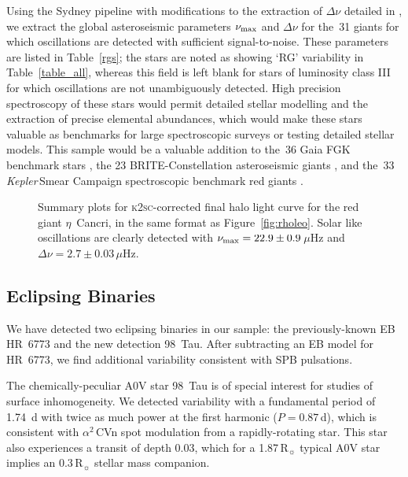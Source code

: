 \documentclass[modern]{aastex62}
\newcommand{\numax}{\mbox{$\nu_{\rm max}$}\xspace}
\newcommand{\Dnu}{\mbox{$\Delta \nu$}\xspace}
\newcommand{\muHz}{\mbox{$\mu$Hz}\xspace}
\newcommand{\rsun}{\mbox{$\mathrm{R}_{\sun}$}\xspace}
\newcommand\kepler{\emph{Kepler}\,}
\begin{document}
Using the Sydney pipeline \citep{Huber2009} with modifications to the extraction of \Dnu detailed in \citep{Yu2018}, we extract the global asteroseismic parameters \numax and \Dnu for the~31 giants for which oscillations are detected with sufficient signal-to-noise. These parameters are listed in Table~\ref{rgs}; the stars are noted as showing `RG' variability in Table~\ref{table_all}, whereas this field is left blank for stars of luminosity class III for which oscillations are not unambiguously detected. High precision spectroscopy of these stars would permit detailed stellar modelling and the extraction of precise elemental abundances, which would make these stars valuable as benchmarks for large spectroscopic surveys or testing detailed stellar models. This sample would be a valuable addition to the~36 Gaia FGK benchmark stars \citep{gaiabenchmark1,gaiabenchmark3,2018RNAAS...2c.152J}, the 23 BRITE-Constellation asteroseismic giants \citep{Kallinger2019}, and the~33 \kepler Smear Campaign spectroscopic benchmark red giants \citep{smearcampaign}. 

\begin{figure*}
\caption{Summary plots for \textsc{k2sc}-corrected final halo light curve for the red giant $\eta$~Cancri, in the same format as Figure~\ref{fig:rholeo}. Solar like oscillations are clearly detected with $\numax = 22.9 \pm 0.9$\,\muHz and $\Dnu = 2.7 \pm 0.03$\,\muHz.}
\label{fig:etacnc}
\end{figure*}


\subsection{Eclipsing Binaries}
\label{sec:ebs}

We have detected two eclipsing binaries in our sample: the previously-known EB HR~6773 and the new detection 98~Tau. After subtracting an EB model for HR~6773, we find additional variability consistent with SPB pulsations. 


The chemically-peculiar A0V star 98~Tau is of special interest for studies of surface inhomogeneity. We detected variability with a fundamental period of 1.74~d with twice as much power at the first harmonic ($P = 0.87$\,d), which is consistent with $\alpha^2$\,CVn spot modulation from a rapidly-rotating star. This star also experiences a transit of depth 0.03, which for a 1.87\,\rsun typical A0V star implies an 0.3\,\rsun stellar mass companion. 
\end{document}
